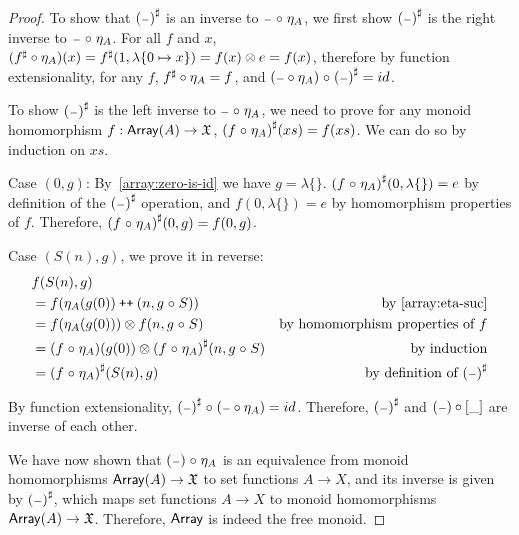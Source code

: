 \begin{proof}
    To show that ${({\scriptstyle{-}})}^{\sharp}$ is an inverse to ${\scriptstyle{-}} \mathrel{\circ} \eta_A$,
    we first show ${({\scriptstyle{-}})}^{\sharp}$ is the right inverse to ${\scriptstyle{-}} \mathrel{\circ} \eta_A$.
    For all $f$ and $x$, $({f}^{\sharp} \circ \eta_A)(x) = {f}^{\sharp}(1, \lambda\{0 \mapsto x\}) = f(x) \otimes e = f(x)$,
    therefore by function extensionality, for any $f$, ${f}^{\sharp} \circ \eta_A = f$,
    and $({\scriptstyle{-}} \circ \eta_A) \mathrel{\circ} {({\scriptstyle{-}})}^{\sharp} = id$.
    
    To show ${({\scriptstyle{-}})}^{\sharp}$ is the left inverse to ${\scriptstyle{-}} \mathrel{\circ} \eta_A$, we need to prove
    for any monoid homomorphism $f : \operatorname{\mathsf{Array}}(A) \to \mathfrak{X}$, ${(f \mathrel{\circ} \eta_A)}^{\sharp}(xs) = f(xs)$.
    We can do so by induction on $xs$.

    Case $(0, g)$:
    By~\ref{array:zero-is-id} we have $g = \lambda\{\}$.
    ${(f \mathrel{\circ} \eta_A)}^{\sharp}(0, \lambda\{\}) = e$ by definition of the ${({\scriptstyle{-}})}^{\sharp}$ operation,
    and $f(0, \lambda\{\}) = e$ by homomorphism properties of $f$.
    Therefore, ${(f \mathrel{\circ} \eta_A)}^{\sharp}(0, g) = f(0, g)$.

    Case $(S(n), g)$, we prove it in reverse: 
    \begin{align*}
        & f(S(n), g) \\
        & = f(\eta_A(g(0)) \mathbin{\text{\ttfamily\upshape ++}} (n, g \mathrel{\circ} S)) & \text{by~\ref{array:eta-suc}} \\
        & = f(\eta_A(g(0))) \otimes f(n, g \mathrel{\circ} S) & \text{by homomorphism properties of $f$} \\
        & = (f \mathrel{\circ} \eta_A)(g(0)) \otimes {(f \mathrel{\circ}\eta_A)}^{\sharp}(n, g \mathrel{\circ} S) & \text{by induction} \\
        & = {(f \mathrel{\circ} \eta_A)}^{\sharp}(S(n), g) & \text{by definition of ${({\scriptstyle{-}})}^{\sharp}$} 
    \end{align*}

    By function extensionality, ${({\scriptstyle{-}})}^{\sharp} \mathrel{\circ} ({\scriptstyle{-}} \circ \eta_A) = id$.
    Therefore, ${({\scriptstyle{-}})}^{\sharp}$ and $({\scriptstyle{-}}) \circ [\_]$ are inverse of each other.

    We have now shown that $({\scriptstyle{-}}) \mathrel{\circ} \eta_A$ is an equivalence from
    monoid homomorphisms $\operatorname{\mathsf{Array}}(A) \to \mathfrak{X}$
    to set functions $A \to X$, and its inverse is given by ${({\scriptstyle{-}})}^{\sharp}$, which maps set
    functions $A \to X$ to monoid homomorphisms $\operatorname{\mathsf{Array}}(A) \to \mathfrak{X}$. Therefore, $\operatorname{\mathsf{Array}}$ is indeed
    the free monoid.
    
\end{proof}

